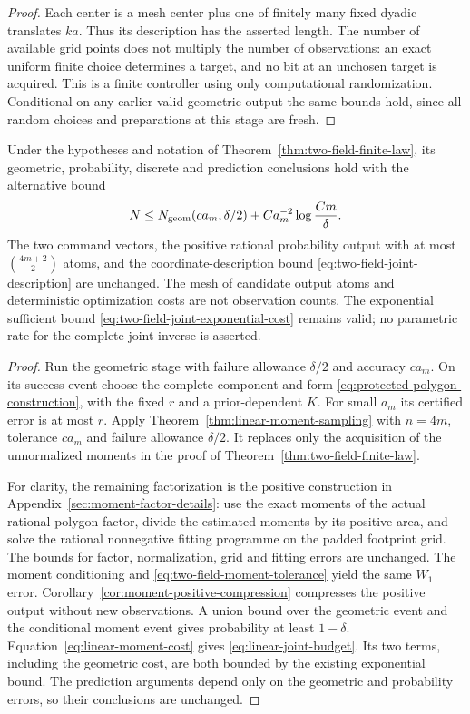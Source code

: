 \begin{proof}
Each center is a mesh center plus one of finitely many fixed dyadic
translates $ka$. Thus its description has the asserted length. The
number of available grid points does not multiply the number of
observations: an exact uniform finite choice determines a target,
and no bit at an unchosen target is acquired. This is a finite
controller using only computational randomization. Conditional on
any earlier valid geometric output the same bounds hold, since all
random choices and preparations at this stage are fresh.
\end{proof}

\begin{corollary}
\label{cor:linear-joint-budget}
Under the hypotheses and notation of
Theorem~\ref{thm:two-field-finite-law}, its geometric, probability,
discrete and prediction conclusions hold with the alternative bound
\begin{equation}\label{eq:linear-joint-budget}
 N\le N_{\rm geom}(c a_m,\delta/2)
                   +Ca_m^{-2}\log\frac{Cm}{\delta}.
\end{equation}
The two command vectors, the positive rational probability output
with at most $\binom{4m+2}{2}$ atoms, and the coordinate-description
bound \eqref{eq:two-field-joint-description} are unchanged. The
mesh of candidate output atoms and deterministic optimization costs
are not observation counts. The exponential sufficient bound
\eqref{eq:two-field-joint-exponential-cost} remains valid; no
parametric rate for the complete joint inverse is asserted.
\end{corollary}
\begin{proof}
Run the geometric stage with failure allowance $\delta/2$ and
accuracy $c a_m$. On its success event choose the complete component
and form \eqref{eq:protected-polygon-construction}, with the fixed
$r$ and a prior-dependent $K$. For small $a_m$ its certified error
is at most $r$. Apply Theorem~\ref{thm:linear-moment-sampling} with
$n=4m$, tolerance $c a_m$ and failure allowance $\delta/2$.
It replaces only the acquisition of the unnormalized moments in
the proof of Theorem~\ref{thm:two-field-finite-law}.

For clarity, the remaining factorization is the positive construction
in Appendix~\ref{sec:moment-factor-details}: use the exact moments
of the actual rational polygon factor, divide the estimated moments
by its positive area, and solve the rational nonnegative fitting
programme on the padded footprint grid. The bounds for factor,
normalization, grid and fitting errors are unchanged. The moment
conditioning and \eqref{eq:two-field-moment-tolerance} yield the
same $W_1$ error. Corollary~\ref{cor:moment-positive-compression}
compresses the positive output without new observations. A union
bound over the geometric event and the conditional moment event gives
probability at least $1-\delta$. Equation~\eqref{eq:linear-moment-cost}
gives \eqref{eq:linear-joint-budget}. Its two terms, including the
geometric cost, are both bounded by the existing exponential bound.
The prediction arguments depend only on the geometric and probability
errors, so their conclusions are unchanged.
\end{proof}

